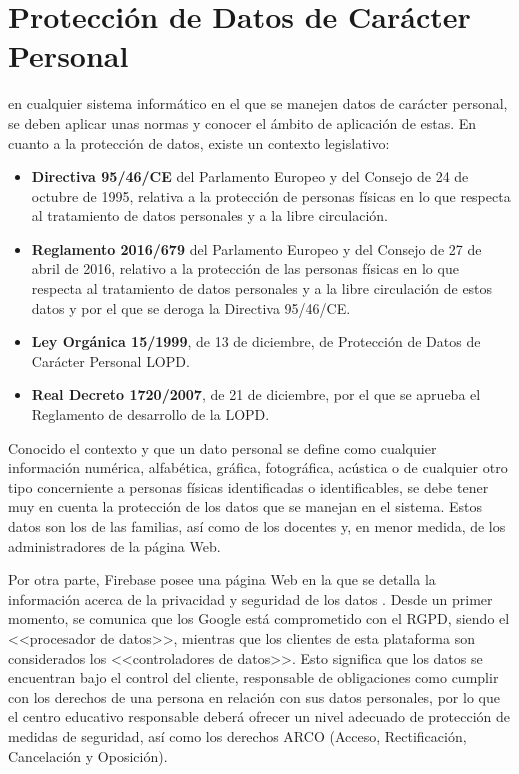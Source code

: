 \chapter{Protección de Datos de Carácter Personal}
\label{chap:lopd}
 en cualquier sistema informático en el que se manejen datos de carácter personal, se deben aplicar unas normas y conocer el ámbito de aplicación de estas.  En cuanto a la protección de datos, existe un contexto legislativo:

\begin{itemize}
	\item \textbf{Directiva 95/46/CE} del Parlamento Europeo y del Consejo de 24 de octubre de 1995, relativa a la protección de personas físicas en lo que respecta al tratamiento de datos personales y a la libre circulación.
	\item \textbf{Reglamento 2016/679} del Parlamento Europeo y del Consejo de 27 de abril de 2016, relativo a la protección de las personas físicas en lo que respecta al tratamiento de datos personales y a la libre circulación de estos datos y por el que se deroga la Directiva 95/46/CE.
	\item \textbf{Ley Orgánica 15/1999}, de 13 de diciembre, de Protección de Datos de Carácter Personal \acf{LOPD}.
	\item \textbf{Real Decreto 1720/2007}, de 21 de diciembre, por el que se aprueba el Reglamento de desarrollo de la \acs{LOPD}.
\end{itemize}

Conocido el contexto y que un dato personal se define como cualquier información numérica, alfabética, gráfica, fotográfica, acústica o de cualquier otro tipo concerniente a personas físicas identificadas o identificables, se debe tener muy en cuenta la protección de los datos que se manejan en el sistema. Estos datos son los de las familias, así como de los docentes y, en menor medida, de los administradores de la página Web.

Por otra parte, Firebase posee una página Web en la que se detalla la información acerca de la privacidad y seguridad de los datos \cite{Firebase2018}. Desde un primer momento, se comunica que los Google está comprometido con el \acs{RGPD}, siendo el <<procesador de datos>>, mientras que los clientes de esta plataforma son considerados los <<controladores de datos>>. Esto significa que los datos se encuentran bajo el control del cliente, responsable de obligaciones como cumplir con los derechos de una persona en relación con sus datos personales, por lo que el centro educativo responsable deberá ofrecer un nivel adecuado de protección de medidas de seguridad, así como los derechos ARCO (Acceso, Rectificación, Cancelación y Oposición).